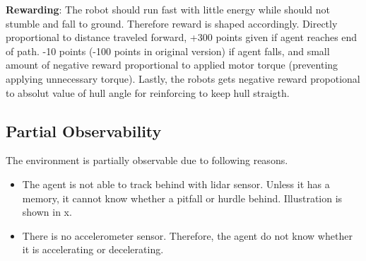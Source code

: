 \textbf{Rewarding}: The robot should run fast with little energy while should not stumble and fall to ground. Therefore reward is shaped accordingly. Directly proportional to distance traveled forward, +300 points given if agent reaches end of path. -10 points (-100 points in original version)  if agent falls, and small amount of negative reward proportional to applied motor torque (preventing applying unnecessary torque). Lastly, the robots gets negative reward propotional to absolut value of hull angle for reinforcing to keep hull straigth. \\
\subsection{Partial Observability}
The environment is partially observable due to following reasons.
\begin{itemize}
	\item The agent is not able to track behind with lidar sensor. Unless it has a memory, it cannot know whether a pitfall or hurdle behind. Illustration is shown in x.
	\item There is no accelerometer sensor. Therefore, the agent do not know whether it is accelerating or decelerating.
\end{itemize}
